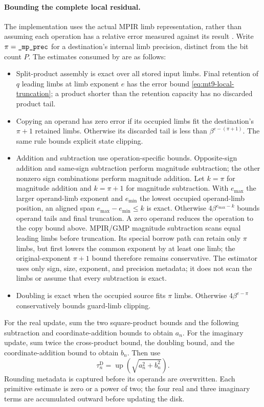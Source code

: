 \paragraph{Bounding the complete local residual.}
The implementation uses the actual MPIR limb representation, rather than
assuming each operation has a relative error measured against its result
\cite{GMPFloatManual,MPIR_Library}. Write $\pi=\texttt{\_mp\_prec}$ for a
destination's internal limb precision, distinct from the bit count $P$.
The estimates consumed by  are as follows:
\begin{itemize}
 \item Split-product assembly is exact over all stored input limbs.
       Final retention of $q$ leading limbs at limb exponent $e$ has the
       error bound \eqref{eq:mt9-local-truncation}; a product shorter than
       the retention capacity has no discarded product tail.
 \item Copying an operand has zero error if its occupied limbs fit the
       destination's $\pi+1$ retained limbs. Otherwise its discarded tail
       is less than $\beta^{e-(\pi+1)}$. The same rule bounds explicit
       state clipping.
 \item Addition and subtraction use operation-specific bounds. Opposite-sign
       addition and same-sign subtraction perform magnitude subtraction; the
       other nonzero sign combinations perform magnitude addition. Let $k=\pi$
       for magnitude addition and $k=\pi+1$ for magnitude subtraction.
       With $e_{\max}$ the larger operand-limb exponent and $e_{\min}$ the
       lowest occupied operand-limb position, an aligned span
       $e_{\max}-e_{\min}\le k$ is exact. Otherwise
       $4\beta^{e_{\max}-k}$ bounds operand tails and final truncation.
       A zero operand reduces the operation to the copy bound above.
       MPIR/GMP magnitude subtraction scans equal leading limbs before
       truncation. Its special borrow path can retain only $\pi$ limbs,
       but first lowers the common exponent by at least one limb; the
       original-exponent $\pi+1$ bound therefore remains conservative.
       The estimator uses only sign, size, exponent, and precision metadata;
       it does not scan the limbs or assume that every subtraction is exact.
 \item Doubling is exact when the occupied source fits $\pi$ limbs.
       Otherwise $4\beta^{e-\pi}$ conservatively bounds guard-limb clipping.
\end{itemize}
For the real update, sum the two square-product bounds and the following
subtraction and coordinate-addition bounds to obtain $a_n$. For the imaginary
update, sum twice the cross-product bound, the doubling bound, and the
coordinate-addition bound to obtain $b_n$. Then use
\[
 \tau_n^{\mathrm D}=\operatorname{up}\left(\sqrt{a_n^2+b_n^2}\right).
\]
Rounding metadata is captured before its operands are overwritten. Each
primitive estimate is zero or a power of two; the four real and three
imaginary terms are accumulated outward before updating the disk.

